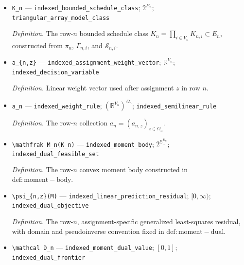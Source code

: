 \documentclass{article}
\begin{document}
\begin{itemize}
  \par\smallskip\noindent\emph{Definition.} The row-\(n\) local evaluation polytope constructed in \(\mathrm{def:indexed-bounded-fourier-class}\).
  \item \texttt{K\_\allowbreak{}n} --- \texttt{indexed\_\allowbreak{}bounded\_\allowbreak{}schedule\_\allowbreak{}class}; \(2^{E_n}\); \texttt{triangular\_\allowbreak{}array\_\allowbreak{}model\_\allowbreak{}class}
  \par\smallskip\noindent\emph{Definition.} The row-\(n\) bounded schedule class \(K_n=\prod_{i\in V_n}K_{n,i}\subset E_n\), constructed from \(\pi_n\), \(\Gamma_{n,i}\), and \(\mathcal S_{n,i}\).
  \item \texttt{a\_\allowbreak{}\{n,\allowbreak{}z\}\allowbreak{}} --- \texttt{indexed\_\allowbreak{}assignment\_\allowbreak{}weight\_\allowbreak{}vector}; \(\mathbb R^{V_n}\); \texttt{indexed\_\allowbreak{}decision\_\allowbreak{}variable}
  \par\smallskip\noindent\emph{Definition.} Linear weight vector used after assignment \(z\) in row \(n\).
  \item \texttt{a\_\allowbreak{}n} --- \texttt{indexed\_\allowbreak{}weight\_\allowbreak{}rule}; \((\mathbb R^{V_n})^{\Omega_n}\); \texttt{indexed\_\allowbreak{}semilinear\_\allowbreak{}rule}
  \par\smallskip\noindent\emph{Definition.} The row-\(n\) collection \(a_n=(a_{n,z})_{z\in\Omega_n}\).
  \item \texttt{\textbackslash{}\allowbreak{}mathfrak M\_\allowbreak{}n(K\_\allowbreak{}n)} --- \texttt{indexed\_\allowbreak{}moment\_\allowbreak{}body}; \(2^{\mathbb S_+^{E_n}}\); \texttt{indexed\_\allowbreak{}dual\_\allowbreak{}feasible\_\allowbreak{}set}
  \par\smallskip\noindent\emph{Definition.} The row-\(n\) convex moment body constructed in \(\mathrm{def:moment-body}\).
  \item \texttt{\textbackslash{}\allowbreak{}psi\_\allowbreak{}\{n,\allowbreak{}z\}\allowbreak{}(M)} --- \texttt{indexed\_\allowbreak{}linear\_\allowbreak{}prediction\_\allowbreak{}residual}; \([0,\infty)\); \texttt{indexed\_\allowbreak{}dual\_\allowbreak{}objective}
  \par\smallskip\noindent\emph{Definition.} The row-\(n\), assignment-specific generalized least-squares residual, with domain and pseudoinverse convention fixed in \(\mathrm{def:moment-dual}\).
  \item \texttt{\textbackslash{}\allowbreak{}mathcal D\_\allowbreak{}n} --- \texttt{indexed\_\allowbreak{}moment\_\allowbreak{}dual\_\allowbreak{}value}; \([0,1]\); \texttt{indexed\_\allowbreak{}dual\_\allowbreak{}frontier}

\end{itemize}
\end{document}
